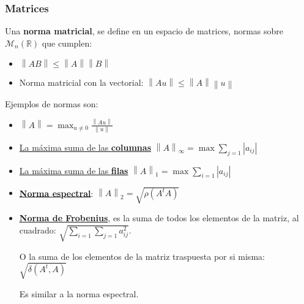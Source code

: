 \subsubsection{Matrices}
Una \textbf{norma matricial}, se define en un espacio de matrices, normas sobre \(\mathcal{M}_n(\mathbb{R})\) que cumplen:
\begin{itemize}
        \item \(\left \| AB \right \| \leq  \left \|  A\right \|\left \|  B\right \|\)
        \item Norma matricial con la vectorial: \(\left \| Au \right \| \leq \left \| A \right \| \left \| u \right \|\)
\end{itemize}
Ejemplos de normas son:
\begin{itemize}
        \item \(\left \| A \right \| = \max _{u \neq 0} \frac{\left \| Au \right \|}{\left \| u \right \|}\)
        \item \underline{La máxima suma de las \textbf{columnas}} \(\left \| A \right \|_\infty = \max  \sum_{j=1} \left | a_{ij} \right |\)
        \item \underline{La máxima suma de las \textbf{filas}} \(\left \| A \right \|_1 = \max  \sum_{i=1} \left | a_{ij} \right |\)
        \item \textbf{\underline{Norma espectral}}: \(\left \| A \right \|_2 = \sqrt{\rho(A^tA)}\)
        \item \textbf{\underline{Norma de Frobenius}}, es la suma de todos los elementos de la matriz, al cuadrado: \(\sqrt{\sum_{i=1}\sum_{j=1} a_{ij}^2}\).\par O la suma de los elementos de la matriz traspuesta por si misma: \(\sqrt{\delta(A^t,A)}\) \par Es similar a la norma espectral.
\end{itemize}
